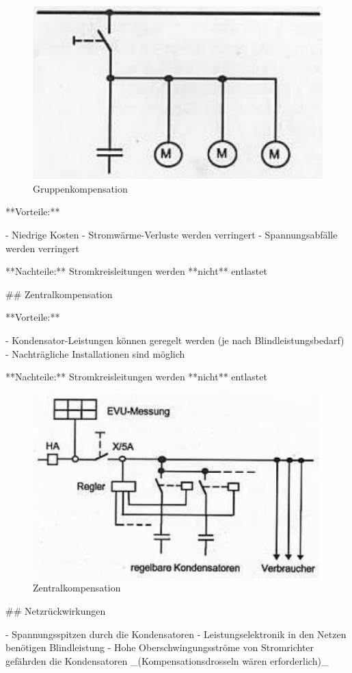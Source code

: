 \begin{markdown}
\begin{figure}
    \vspace{-1em}
    \centering
    \includegraphics[width=0.8\linewidth]{./images/11-Kompensationsanlagen/Gruppenkompensation.png}
    \caption[Gruppenkompensation]{Gruppenkompensation}
\end{figure}

**Vorteile:**

- Niedrige Kosten
- Stromwärme-Verluste werden verringert
- Spannungsabfälle werden verringert

**Nachteile:** Stromkreisleitungen werden **nicht** entlastet

\vspace{4em}

## Zentralkompensation


**Vorteile:**

- Kondensator-Leistungen können geregelt werden (je nach Blindleistungsbedarf) 
- Nachträgliche Installationen sind möglich

**Nachteile:** Stromkreisleitungen werden **nicht** entlastet

\begin{figure}[H]
    \centering
    \includegraphics[width=0.5\linewidth]{./images/11-Kompensationsanlagen/Zentralkompensation.png}
    \caption[Zentralkompensation]{Zentralkompensation}
\end{figure}

## Netzrückwirkungen

- Spannungsspitzen durch die Kondensatoren
- Leistungselektronik in den Netzen benötigen Blindleistung 
- Hohe Oberschwingungsströme von Stromrichter gefährden die Kondensatoren _(Kompensationsdrosseln wären erforderlich)_

\end{markdown}